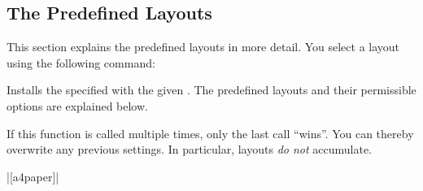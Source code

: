 \subsection{The Predefined Layouts}

This section explains the predefined layouts in more detail. You select a
layout using the following command:
%
\begin{command}{\pgfpagesuselayout{}}
    Installs the specified  with the given . The
    predefined layouts and their permissible options are explained below.

    If this function is called multiple times, only the last call ``wins''. You
    can thereby overwrite any previous settings. In particular, layouts
    \emph{do not} accumulate.

    \example |[a4paper]|
\end{command}

